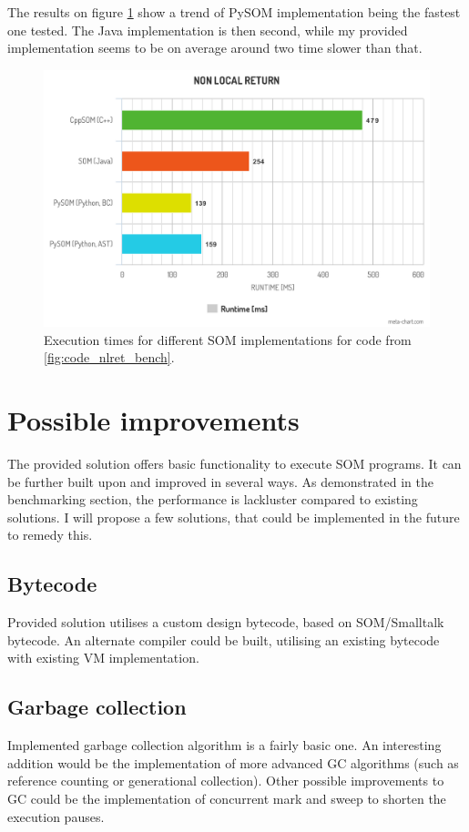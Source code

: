 \documentclass[thesis=M,english]{FITthesis}[2019/12/23]
\begin{document}
The results on figure \ref{fig:nlret_chart} show a trend of PySOM implementation being the fastest one tested.
The Java implementation is then second, while my provided implementation seems to be on average around two time slower
than that.

\begin{figure}
	\centering
	\includegraphics[width=\textwidth]{media/nlret_chart_1.png}
	\caption{Execution times for different SOM implementations for code from \ref{fig:code_nlret_bench}.}
	\label{fig:nlret_chart}
\end{figure}

\section{Possible improvements}
The provided solution offers basic functionality to execute SOM programs. It can be further built upon and improved in several ways.
As demonstrated in the benchmarking section, the performance is lackluster compared to existing solutions. I will propose a few
solutions, that could be implemented in the future to remedy this.

\subsection{Bytecode}
Provided solution utilises a custom design bytecode, based on SOM/Smalltalk bytecode. An alternate compiler could be built, utilising
an existing bytecode with existing VM implementation. 

\subsection{Garbage collection}
Implemented garbage collection algorithm is a fairly basic one. An interesting addition would be the implementation of more advanced GC
algorithms (such as reference counting or generational collection). Other possible improvements to GC could be the implementation
of concurrent mark and sweep to shorten the execution pauses.
\end{document}
